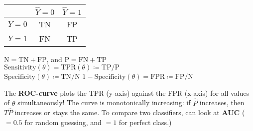 \noindent
\parbox{0.5\linewidth}{%
    \tiny
    \begin{tabular}{|c|c|c|}
        \hline
         & \textbf{$\hat{Y}=0$} & \textbf{$\hat{Y}=1$}  \\ \hline
        \textbf{$Y=0$} & TN & FP  \\ \hline
        \textbf{$Y=1$} & FN & TP \\
        \hline
    \end{tabular}%
}%
\hfill
\parbox{0.5\linewidth}{%
    \raggedright
    $\text{N} = \text{TN} + \text{FP}$, and $\text{P} = \text{FN} + \text{TP}$ \\
    $\text{Sensitivity}(\theta) = \text{TPR}(\theta) \coloneqq \text{TP}/\text{P}$ \\
    $\text{Specificity}(\theta) \coloneqq \text{TN}/\text{N}$
    $1 - \text{Specificity}(\theta) = \text{FPR} \coloneqq \text{FP}/\text{N}$
}
The \textbf{ROC-curve} plots the TPR (y-axis) against the FPR (x-axis) for all values of $\theta$ simultaneously! The curve is monotonically increasing: if $\hat{P}$ increases, then ${T\hat{P}}$ increases or stays the same. To compare two classifiers, can look at \textbf{AUC} ($=0.5$ for random guessing, and $=1$ for perfect class.)